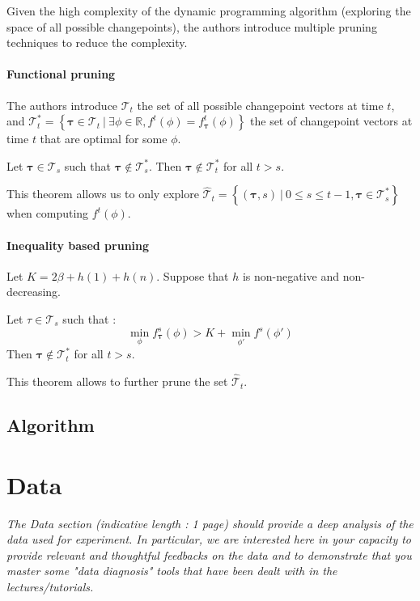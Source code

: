 \documentclass[11pt]{article}
\begin{document}
Given the high complexity of the dynamic programming algorithm (exploring the space of all possible changepoints), the authors introduce multiple pruning techniques to reduce the complexity.

\paragraph*{Functional pruning} The authors introduce $\mathcal{T}_t$ the set of all possible changepoint vectors at time $t$, and $\mathcal{T}_t^*=\left\{\boldsymbol{\tau}\in \mathcal{T}_t \:\big|\: \exists\phi\in\mathbb{R}, f^t(\phi)=f_{\boldsymbol{\tau}}^t(\phi)\right\}$ the set of changepoint vectors at time $t$ that are optimal for some $\phi$.

\begin{theorem}
    \label{th:functional_pruning}
    Let $\boldsymbol{\tau}\in\mathcal{T}_s$ such that $\boldsymbol{\tau}\notin \mathcal{T}_s^*$. Then $\boldsymbol{\tau}\notin \mathcal{T}_t^*$ for all $t>s$.
\end{theorem}

This theorem allows us to only explore $\hat{\mathcal{T}}_t=\left\{(\boldsymbol{\tau},s)\:\big|\: 0\leq s\leq t-1, \boldsymbol{\tau}\in \mathcal{T}_s^*\right\}$ when computing $f^t(\phi)$.

\paragraph*{Inequality based pruning} Let $K=2\beta+h(1)+h(n)$. Suppose that $h$ is non-negative and non-decreasing.

\begin{theorem}
    Let $\tau\in\mathcal{T}_s$ such that :
    $$\min_\phi f_{\boldsymbol{\tau}}^s(\phi) > K + \min_{\phi'} f^s(\phi')$$
    Then $\boldsymbol{\tau}\notin \mathcal{T}_t^*$ for all $t>s$.
\end{theorem}

This theorem allows to further prune the set $\hat{\mathcal{T}}_t$.

\subsection{Algorithm}



\section{Data}
\textit{
    The Data section (indicative length : 1 page) should provide a deep analysis of the data used for experiment. In particular, we are interested here in your capacity to provide relevant and thoughtful feedbacks on the data and to demonstrate that you master some "data diagnosis" tools that have been dealt with in the lectures/tutorials.
}
\end{document}

